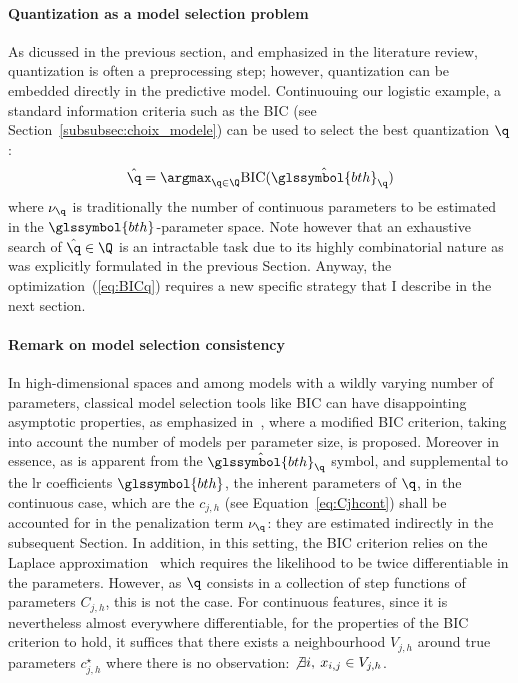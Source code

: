 \paragraph{Quantization as a model selection problem} \label{par:model_selec}

As dicussed in the previous section, and emphasized in the literature review, quantization is often a preprocessing step; however, quantization can be embedded directly in the predictive model. Continuouing our logistic example, a standard information criteria such as the BIC (see Section~\ref{subsubsec:choix_modele}) can be used to select the best quantization $\q$:
\begin{equation}
    \label{eq:BICq}
    \hat{\q}=\argmax_{\q \in \Q} \text{BIC}(\hat{\glssymbol{bth}}_\q)
\end{equation}
where $\nu_\q$ is traditionally the number of continuous parameters to be estimated in the $\glssymbol{bth}$-parameter space. Note however that an exhaustive search of $\hat{\q}\in\Q$ is an intractable task due to its highly combinatorial nature as was explicitly formulated in the previous Section. Anyway, the optimization~(\ref{eq:BICq}) requires a new specific strategy that I describe in the next section.

\paragraph{Remark on model selection consistency} \label{par:consistency}

In high-dimensional spaces and among models with a wildly varying number of parameters, classical model selection tools like BIC can have disappointing asymptotic properties, as emphasized in~\cite{chen2008extended}, where a modified BIC criterion, taking into account the number of models per parameter size, is proposed.
Moreover in essence, as is apparent from the $\hat{\glssymbol{bth}}_\q$ symbol, and supplemental to the \gls{lr} coefficients $\glssymbol{bth}$, the inherent parameters of $\q$, in the continuous case, which are the $c_{j,h}$ (see Equation~\eqref{eq:Cjhcont}) shall be accounted for in the penalization term $\nu_\q$: they are estimated indirectly in the subsequent Section.
In addition, in this setting, the BIC criterion relies on the Laplace approximation~\cite{lebarbier} which requires the likelihood to be twice differentiable in the parameters. However, as $\q$ consists in a collection of step functions of parameters $C_{j,h}$, this is not the case. For continuous features, since it is nevertheless almost everywhere differentiable, for the properties of the BIC criterion to hold, it suffices that there exists a neighbourhood $V_{j,h}$ around true parameters $c_{j,h}^\star$ where there is no observation: $\not\exists i, \: x_{i,j} \in V_{j,h}$.

